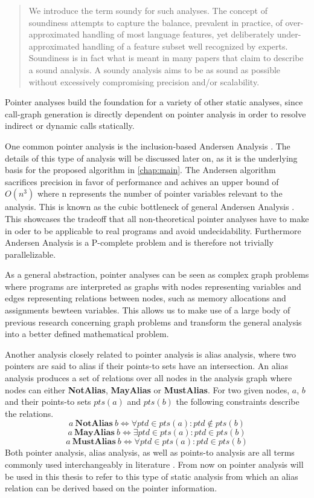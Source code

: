 \begin{quote}
    We introduce the term soundy for
    such analyses. The concept of soundiness 
    attempts to capture the balance,
    prevalent in practice, of over-approximated
    handling of most language features, yet deliberately 
    under-approximated handling of a feature subset well
    recognized by experts. Soundiness is in
    fact what is meant in many papers that
    claim to describe a sound analysis. A
    soundy analysis aims to be as sound as
    possible without excessively compromising 
    precision and/or scalability.
\end{quote}

Pointer analyses build the foundation for a variety of other static analyses, since call-graph generation is directly dependent on pointer analysis in order to resolve indirect or dynamic calls statically.

One common pointer analysis is the inclusion-based Andersen Analysis \cite{andersen1994program}. The details of this type of analysis will be discussed later on, as it is the underlying basis for the proposed algorithm in \autoref{chap:main}. The Andersen algorithm sacrifices precision in favor of performance and achives an upper bound of $O(n^3)$ where n represents the number of pointer variables relevant to the analysis. This is known as the cubic bottleneck of general Andersen Analysis \cite{mathiasen2021fine}.
This showcases the tradeoff that all non-theoretical pointer analyses have to make in oder to be applicable to real programs and avoid undecidability. Furthermore Andersen Analysis is a P-complete problem and is therefore not trivially parallelizable.

As a general abstraction, pointer analyses can be seen as complex graph problems where programs are interpreted as graphs with nodes representing variables and edges representing relations between nodes, such as memory allocations and assignments bewteen variables.
This allows us to make use of a large body of previous research concerning graph problems and transform the general analysis into a better defined mathematical problem.

Another analysis closely related to pointer analysis is alias analysis, where two pointers are said to alias if their points-to sets have an intersection. An alias analysis produces a set of relations over all nodes in the analysis graph where nodes can either \textbf{NotAlias}, \textbf{MayAlias} or \textbf{MustAlias}.
For two given nodes, $a$, $b$ and their points-to sets $pts(a)$ and $pts(b)$ the following constraints describe the relations.
$$a\ \textbf{NotAlias}\ b \iff \forall ptd \in pts(a) \colon ptd \notin pts(b)$$
$$a\ \textbf{MayAlias}\ b \iff \exists ptd \in pts(a) \colon ptd \in pts(b)$$
$$a\ \textbf{MustAlias}\ b \iff \forall ptd \in pts(a) \colon ptd \in pts(b)$$
Both pointer analysis, alias analysis, as well as points-to analysis are all terms commonly used interchangeably in literature \cite{hind2001pointer}. From now on pointer analysis will be used in this thesis to refer to this type of static analysis from which an alias relation can be derived based on the pointer information.

